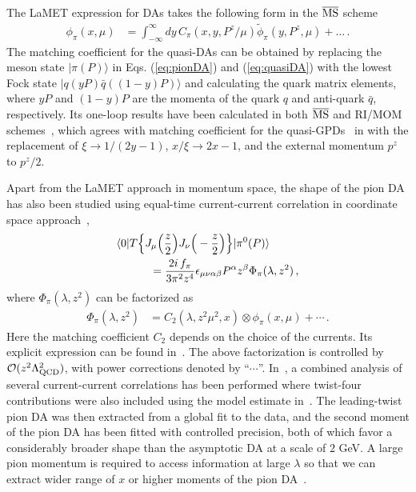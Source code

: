 The LaMET expression for DAs takes the following form in the ${\overline{\rm MS}}$ scheme~\cite{Ji:2015qla,Liu:2018tox}
\begin{align}\label{eq:matching2}
	\phi_\pi(x,\mu) &=\int_{-\infty}^\infty dy\, C_{\pi}\left(x,y,P^z/\mu\right) \tilde\phi_\pi(y,P^z,\mu)+\ldots\,.
\end{align}
The matching coefficient  for the quasi-DAs can be obtained by replacing the meson state $| \pi(P)\rangle$ in Eqs. (\ref{eq:pionDA}) and (\ref{eq:quasiDA}) with the lowest Fock state $| q(y P) \bar q((1-y)P)\rangle$ and calculating the quark matrix elements, where $y P$ and $(1-y)P$ are the momenta of the quark $q$ and anti-quark $\bar q$, respectively. Its one-loop results have been calculated in both ${\overline{\rm MS}}$ and RI/MOM schemes~\cite{Liu:2018tox}, which agrees with matching coefficient for the quasi-GPDs~\cite{Ji:2015qla,Xiong:2015nua,Liu:2019urm} in  with the replacement of $\xi\to 1/(2y-1)$, $x/\xi\to 2x-1$, and the external momentum $p^z$ to $p^z/2$.

Apart from the LaMET approach in momentum space,
the shape of the pion DA has also been studied using equal-time current-current correlation in coordinate space approach~\cite{Bali:2017gfr,Bali:2018spj},
\begin{align}
	&\langle 0 | T\Big\{J_\mu\Big(\frac{z}{2}\Big) J_\nu\Big(-\frac{z}{2}\Big)\Big\}| \pi^0(P)\rangle \nonumber\\
	& \hspace{3em}= \frac{2i\, f_\pi}{3 \pi^2 z^4} \epsilon_{\mu\nu\alpha\beta} P^\alpha z^\beta \Phi_\pi(\lambda, z^2)\,,
	\label{eq:pigg-in-z-space}
\end{align}
where $\Phi_\pi(\lambda, z^2)$ can be factorized as
\begin{align} \label{twist_decomposition_heuristic}
	\Phi_\pi(\lambda, z^2) &= C_2 (\lambda,z^2\mu^2, x)\otimes \phi_\pi(x,\mu)+\cdots\,.
\end{align}
Here the matching coefficient $C_2$ depends  on the choice of the currents. Its explicit expression can be found in~\cite{Bali:2018spj}.
The above factorization is controlled by ${\mathcal O}(z^2\Lambda_{\rm QCD}^2)$, with power corrections denoted by ``$\cdots$''. In~\cite{Bali:2018spj}, a combined analysis of several current-current correlations has been performed where twist-four contributions were also included using the model estimate in~\cite{Braun:1989iv,Ball:2006wn}. {The leading-twist pion DA was then extracted from a global fit to the data, and the second moment of the pion DA has been fitted with controlled precision}, both of which favor a considerably broader shape than the asymptotic DA at a scale of $2$ GeV.
A large pion momentum is required to access information at large $\lambda$ so that we can extract wider range of $x$ or higher moments of the pion DA~\cite{Bali:2017gfr}.

